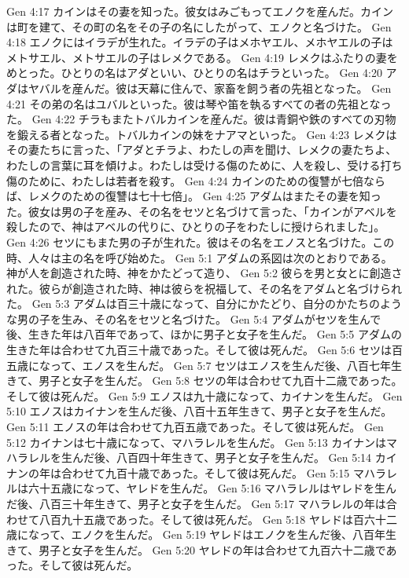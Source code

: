 Gen 4:17  カインはその妻を知った。彼女はみごもってエノクを産んだ。カインは町を建て、その町の名をその子の名にしたがって、エノクと名づけた。
Gen 4:18  エノクにはイラデが生れた。イラデの子はメホヤエル、メホヤエルの子はメトサエル、メトサエルの子はレメクである。
Gen 4:19  レメクはふたりの妻をめとった。ひとりの名はアダといい、ひとりの名はチラといった。
Gen 4:20  アダはヤバルを産んだ。彼は天幕に住んで、家畜を飼う者の先祖となった。
Gen 4:21  その弟の名はユバルといった。彼は琴や笛を執るすべての者の先祖となった。
Gen 4:22  チラもまたトバルカインを産んだ。彼は青銅や鉄のすべての刃物を鍛える者となった。トバルカインの妹をナアマといった。
Gen 4:23  レメクはその妻たちに言った、「アダとチラよ、わたしの声を聞け、レメクの妻たちよ、わたしの言葉に耳を傾けよ。わたしは受ける傷のために、人を殺し、受ける打ち傷のために、わたしは若者を殺す。
Gen 4:24  カインのための復讐が七倍ならば、レメクのための復讐は七十七倍」。
Gen 4:25  アダムはまたその妻を知った。彼女は男の子を産み、その名をセツと名づけて言った、「カインがアベルを殺したので、神はアベルの代りに、ひとりの子をわたしに授けられました」。
Gen 4:26  セツにもまた男の子が生れた。彼はその名をエノスと名づけた。この時、人々は主の名を呼び始めた。
Gen 5:1  アダムの系図は次のとおりである。神が人を創造された時、神をかたどって造り、
Gen 5:2  彼らを男と女とに創造された。彼らが創造された時、神は彼らを祝福して、その名をアダムと名づけられた。
Gen 5:3  アダムは百三十歳になって、自分にかたどり、自分のかたちのような男の子を生み、その名をセツと名づけた。
Gen 5:4  アダムがセツを生んで後、生きた年は八百年であって、ほかに男子と女子を生んだ。
Gen 5:5  アダムの生きた年は合わせて九百三十歳であった。そして彼は死んだ。
Gen 5:6  セツは百五歳になって、エノスを生んだ。
Gen 5:7  セツはエノスを生んだ後、八百七年生きて、男子と女子を生んだ。
Gen 5:8  セツの年は合わせて九百十二歳であった。そして彼は死んだ。
Gen 5:9  エノスは九十歳になって、カイナンを生んだ。
Gen 5:10  エノスはカイナンを生んだ後、八百十五年生きて、男子と女子を生んだ。
Gen 5:11  エノスの年は合わせて九百五歳であった。そして彼は死んだ。
Gen 5:12  カイナンは七十歳になって、マハラレルを生んだ。
Gen 5:13  カイナンはマハラレルを生んだ後、八百四十年生きて、男子と女子を生んだ。
Gen 5:14  カイナンの年は合わせて九百十歳であった。そして彼は死んだ。
Gen 5:15  マハラレルは六十五歳になって、ヤレドを生んだ。
Gen 5:16  マハラレルはヤレドを生んだ後、八百三十年生きて、男子と女子を生んだ。
Gen 5:17  マハラレルの年は合わせて八百九十五歳であった。そして彼は死んだ。
Gen 5:18  ヤレドは百六十二歳になって、エノクを生んだ。
Gen 5:19  ヤレドはエノクを生んだ後、八百年生きて、男子と女子を生んだ。
Gen 5:20  ヤレドの年は合わせて九百六十二歳であった。そして彼は死んだ。
